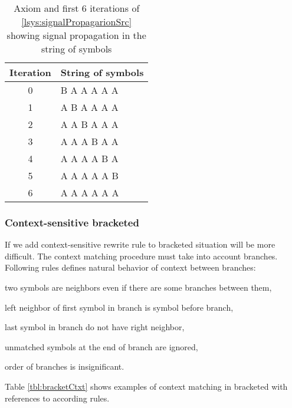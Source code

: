 \begin{table}[h]
	\centering
	\begin{tabular}{c l}
   		\toprule
   		Iteration & String of symbols \\
   		\midrule
		0 & B A A A A A \\
		1 & A B A A A A \\
		2 & A A B A A A \\
		3 & A A A B A A \\
		4 & A A A A B A \\
		5 & A A A A A B \\
		6 & A A A A A A \\
		\bottomrule
	\end{tabular}
	\caption{Axiom and first 6 iterations of \lsystem \ref{lsys:signalPropagarionSrc} showing signal propagation in the string of symbols}
	\label{fig:signalPropagarion}
\end{table}


\subsubsection{Context-sensitive bracketed \lsystems}

If we add context-sensitive rewrite rule to bracketed \lsystems situation will be more difficult.
The context matching procedure must take into account branches.
Following rules defines natural behavior of context between branches:
\begin{enumerate*}
	\item \label{enum:ctxRule1} two symbols are neighbors even if there are some branches between them,
	\item \label{enum:ctxRule2} left neighbor of first symbol in branch is symbol before branch,
	\item \label{enum:ctxRule3} last symbol in branch do not have right neighbor,
	\item \label{enum:ctxRule4} unmatched symbols at the end of branch are ignored,
	\item \label{enum:ctxRule5} order of branches is insignificant.
\end{enumerate*}

Table \ref{tbl:bracketCtxt} shows examples of context matching in bracketed \lsystems with references to according rules.

